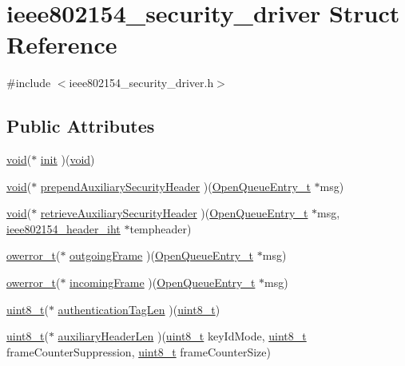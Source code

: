 \hypertarget{structieee802154__security__driver}{}\section{ieee802154\+\_\+security\+\_\+driver Struct Reference}
\label{structieee802154__security__driver}


{\ttfamily \#include $<$ieee802154\+\_\+security\+\_\+driver.\+h$>$}

\subsection*{Public Attributes}
\begin{DoxyCompactItemize}
\item 
\hyperlink{usb__devapi_8h_afabf60e7f57651d6d595a02c75f07cd0}{void}($\ast$ \hyperlink{structieee802154__security__driver_a7189635a857821803ce053824da4005a}{init} )(\hyperlink{usb__devapi_8h_afabf60e7f57651d6d595a02c75f07cd0}{void})
\item 
\hyperlink{usb__devapi_8h_afabf60e7f57651d6d595a02c75f07cd0}{void}($\ast$ \hyperlink{structieee802154__security__driver_a85cc01dd18837b7e3d78832cebf5db66}{prepend\+Auxiliary\+Security\+Header} )(\hyperlink{struct_open_queue_entry__t}{Open\+Queue\+Entry\+\_\+t} $\ast$msg)
\item 
\hyperlink{usb__devapi_8h_afabf60e7f57651d6d595a02c75f07cd0}{void}($\ast$ \hyperlink{structieee802154__security__driver_ae2f969f147c6871c1ddac56374fc9d9a}{retrieve\+Auxiliary\+Security\+Header} )(\hyperlink{struct_open_queue_entry__t}{Open\+Queue\+Entry\+\_\+t} $\ast$msg, \hyperlink{structieee802154__header__iht}{ieee802154\+\_\+header\+\_\+iht} $\ast$tempheader)
\item 
\hyperlink{opendefs_8h_af20b7c3ed9d2ba19e56a309ad9314803}{owerror\+\_\+t}($\ast$ \hyperlink{structieee802154__security__driver_a469618342f4488905c0968e79947d9af}{outgoing\+Frame} )(\hyperlink{struct_open_queue_entry__t}{Open\+Queue\+Entry\+\_\+t} $\ast$msg)
\item 
\hyperlink{opendefs_8h_af20b7c3ed9d2ba19e56a309ad9314803}{owerror\+\_\+t}($\ast$ \hyperlink{structieee802154__security__driver_ae822d5f1fa8ba504ae9b2f9909cfc7a4}{incoming\+Frame} )(\hyperlink{struct_open_queue_entry__t}{Open\+Queue\+Entry\+\_\+t} $\ast$msg)
\item 
\hyperlink{_p_e___types_8h_aba7bc1797add20fe3efdf37ced1182c5}{uint8\+\_\+t}($\ast$ \hyperlink{structieee802154__security__driver_a3ef1593e809f0bed98a974192143b23d}{authentication\+Tag\+Len} )(\hyperlink{_p_e___types_8h_aba7bc1797add20fe3efdf37ced1182c5}{uint8\+\_\+t})
\item 
\hyperlink{_p_e___types_8h_aba7bc1797add20fe3efdf37ced1182c5}{uint8\+\_\+t}($\ast$ \hyperlink{structieee802154__security__driver_a0409cde0e8565436690f8346f94dac93}{auxiliary\+Header\+Len} )(\hyperlink{_p_e___types_8h_aba7bc1797add20fe3efdf37ced1182c5}{uint8\+\_\+t} key\+Id\+Mode, \hyperlink{_p_e___types_8h_aba7bc1797add20fe3efdf37ced1182c5}{uint8\+\_\+t} frame\+Counter\+Suppression, \hyperlink{_p_e___types_8h_aba7bc1797add20fe3efdf37ced1182c5}{uint8\+\_\+t} frame\+Counter\+Size)
\end{DoxyCompactItemize}


